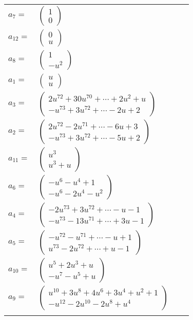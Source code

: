 \documentclass[1p]{elsarticle_modified}
\theoremstyle{definition}
\begin{document}
\begin{tabular}{m{7pt} m{180pt} m{7pt} m{180pt} }
\flushright $a_{7}=$&$\begin{pmatrix}1\\0\end{pmatrix}$ \\
\flushright $a_{12}=$&$\begin{pmatrix}0\\u\end{pmatrix}$ \\
\flushright $a_{8}=$&$\begin{pmatrix}1\\- u^2\end{pmatrix}$ \\
\flushright $a_{1}=$&$\begin{pmatrix}u\\u\end{pmatrix}$ \\
\flushright $a_{3}=$&$\begin{pmatrix}2 u^{72}+30 u^{70}+\cdots+2 u^2+u\\- u^{73}+3 u^{72}+\cdots-2 u+2\end{pmatrix}$ \\
\flushright $a_{2}=$&$\begin{pmatrix}2 u^{72}-2 u^{71}+\cdots-6 u+3\\- u^{73}+3 u^{72}+\cdots-5 u+2\end{pmatrix}$ \\
\flushright $a_{11}=$&$\begin{pmatrix}u^3\\u^3+u\end{pmatrix}$ \\
\flushright $a_{6}=$&$\begin{pmatrix}- u^6- u^4+1\\- u^6-2 u^4- u^2\end{pmatrix}$ \\
\flushright $a_{4}=$&$\begin{pmatrix}-2 u^{73}+3 u^{72}+\cdots- u-1\\- u^{73}-13 u^{71}+\cdots+3 u-1\end{pmatrix}$ \\
\flushright $a_{5}=$&$\begin{pmatrix}- u^{72}- u^{71}+\cdots- u+1\\u^{73}-2 u^{72}+\cdots+u-1\end{pmatrix}$ \\
\flushright $a_{10}=$&$\begin{pmatrix}u^5+2 u^3+u\\- u^7- u^5+u\end{pmatrix}$ \\
\flushright $a_{9}=$&$\begin{pmatrix}u^{10}+3 u^8+4 u^6+3 u^4+u^2+1\\- u^{12}-2 u^{10}-2 u^8+u^4\end{pmatrix}$\\&\end{tabular}
\end{document}
